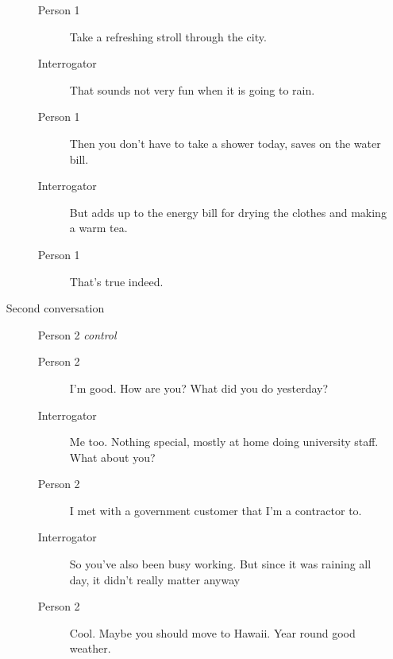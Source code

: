 \begin{itemize}
\begin{description}
\begin{description}
               \item [Person 1] Take a refreshing stroll through the city.
               \item [Interrogator] That sounds not very fun when it is going to rain.
               \item [Person 1] Then you don't have to take a shower today, saves on the water bill.
               \item [Interrogator] But adds up to the energy bill for drying the clothes and making a warm tea.
               \item [Person 1] That's true indeed.
            \end{description}
         \item [Second conversation] Person 2 \textit{control}
\begin{description}
         \item [Person 2] I'm good. How are you? What did you do yesterday?
         \item [Interrogator] Me too. Nothing special, mostly at home doing university staff. What about you?
         \item [Person 2] I met with a government customer that I'm a contractor to.
         \item [Interrogator] So you've also been busy working. But since it was raining all day, it didn't really matter anyway
         \item [Person 2] Cool. Maybe you should move to Hawaii. Year round good weather.
            \end{description}
      \end{description}


\end{itemize}
